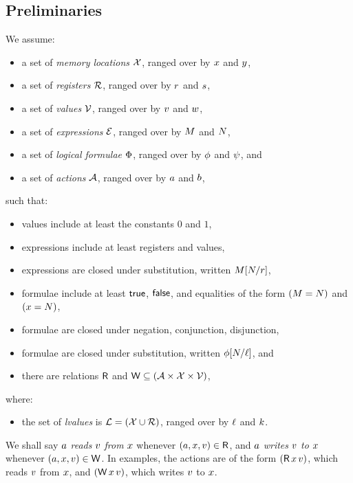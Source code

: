 \subsection{Preliminaries}

We assume:
\begin{itemize}
\item a set of \emph{memory locations} $\mathcal{X}$, ranged over by
  $x$ and $y$,
\item a set of \emph{registers} $\mathcal{R}$, ranged over by
  $r$ and $s$,
\item a set of \emph{values} $\mathcal{V}$, ranged over by
  $v$ and $w$,
\item a set of \emph{expressions} $\mathcal{E}$, ranged over by
  $M$ and $N$,
\item a set of \emph{logical formulae} $\Phi$, ranged over by
  $\phi$ and $\psi$, and
\item a set of \emph{actions} $\mathcal{A}$, ranged over by $a$ and $b$,
\end{itemize}
such that:
\begin{itemize}
\item values include at least the constants $0$ and $1$,
\item expressions include at least registers and values,
\item expressions are closed under substitution, written $M[N/r]$,
\item formulae include at least $\mathsf{true}$, $\mathsf{false}$, and equalities of the form $(M=N)$ and $(x=N)$,
\item formulae are closed under negation, conjunction, disjunction,
\item formulae are closed under substitution, written $\phi[N/\ell]$, and
\item there are relations $\mathsf{R}$ and $\mathsf{W} \subseteq (\mathcal{A} \times \mathcal{X} \times \mathcal{V})$,
\end{itemize}
where:
\begin{itemize}
\item the set of \emph{lvalues} is $\mathcal{L}=(\mathcal{X}\cup\mathcal{R})$, ranged over by $\ell$ and $k$.
\end{itemize}
We shall say $a$ \emph{reads} $v$ \emph{from} $x$ whenever
$(a,x,v) \in \mathsf{R}$, and
$a$ \emph{writes} $v$ \emph{to} $x$ whenever
$(a,x,v) \in \mathsf{W}$.
In examples, the actions are of the form $(\DR{\aLoc}{\aVal})$, which reads $v$ from $x$,
and $(\DW{\aLoc}{\aVal})$, which writes $v$ to $x$.

